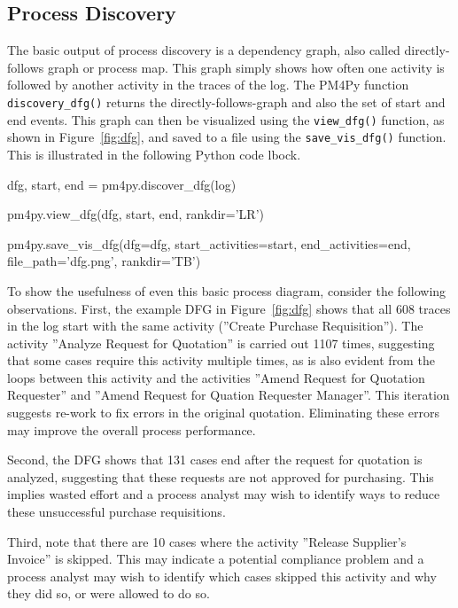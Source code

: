 \subsection*{Process Discovery}

The basic output of process discovery is a dependency graph, also called directly-follows graph or process map. This graph simply shows how often one activity is followed by another activity in the traces of the log. The PM4Py function \texttt{discovery\_dfg()} returns the directly-follows-graph and also the set of start and end events. This graph can then be visualized using the \texttt{view\_dfg()} function, as shown in Figure~\ref{fig:dfg}, and saved to a file using the \texttt{save\_vis\_dfg()} function. This is illustrated in the following Python code lbock.

\begin{samepage}
\begin{pythoncode}
dfg, start, end = pm4py.discover_dfg(log)

pm4py.view_dfg(dfg, start, end, rankdir='LR')

pm4py.save_vis_dfg(dfg=dfg,
    start_activities=start, end_activities=end, 
    file_path='dfg.png', rankdir='TB')
\end{pythoncode}
\end{samepage}

To show the usefulness of even this basic process diagram, consider the following observations. First, the example DFG in Figure~\ref{fig:dfg} shows that all 608 traces in the log start with the same activity (''Create Purchase Requisition''). The activity ''Analyze Request for Quotation'' is carried out 1107 times, suggesting that some cases require this activity multiple times, as is also evident from the loops between this activity and the activities ''Amend Request for Quotation Requester'' and ''Amend Request for Quation Requester Manager''. This iteration suggests re-work to fix errors in the original quotation. Eliminating these errors may improve the overall process performance. 

Second, the DFG shows that 131 cases end after the request for quotation is analyzed, suggesting that these requests are not approved for purchasing. This implies wasted effort and a process analyst may wish to identify ways to reduce these unsuccessful purchase requisitions. 

Third, note that there are 10 cases where the activity ''Release Supplier's Invoice'' is skipped. This may indicate a potential compliance problem and a process analyst may wish to identify which cases skipped this activity and why they did so, or were allowed to do so.

